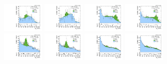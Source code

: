 \begin{figure}[htbp]
  \centering
  \includegraphics[width=0.18\textwidth]{fig/fitValidation/PostFit_SR_MJJ_MVV1000to1500__mu_HP_bb_LDy_Run2.pdf}
  \includegraphics[width=0.18\textwidth]{fig/fitValidation/PostFit_SR_MJJ_MVV1000to1500__e_HP_bb_LDy_Run2.pdf}
  \includegraphics[width=0.18\textwidth]{fig/fitValidation/PostFit_SR_MJJ_MVV1000to1500__mu_LP_bb_LDy_Run2.pdf}
  \includegraphics[width=0.18\textwidth]{fig/fitValidation/PostFit_SR_MJJ_MVV1000to1500__e_LP_bb_LDy_Run2.pdf}\\
  \includegraphics[width=0.18\textwidth]{fig/fitValidation/PostFit_SR_MJJ_MVV1000to1500__mu_HP_nobb_LDy_Run2.pdf}
  \includegraphics[width=0.18\textwidth]{fig/fitValidation/PostFit_SR_MJJ_MVV1000to1500__e_HP_nobb_LDy_Run2.pdf}
  \includegraphics[width=0.18\textwidth]{fig/fitValidation/PostFit_SR_MJJ_MVV1000to1500__mu_LP_nobb_LDy_Run2.pdf}
  \includegraphics[width=0.18\textwidth]{fig/fitValidation/PostFit_SR_MJJ_MVV1000to1500__e_LP_nobb_LDy_Run2.pdf}\\

\end{figure}
